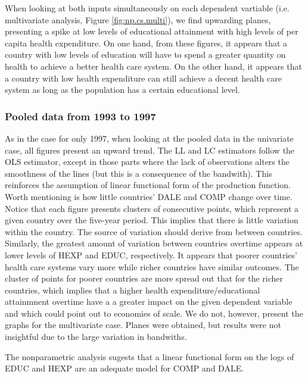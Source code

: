 \documentclass[12pt,a4paper]{article}\usepackage[]{graphicx}\usepackage[]{color}
\begin{document}
When looking at both inputs simultaneously on each dependent vartiable (i.e. multivariate analysis, Figure \ref{fig:np.cs.multi}), we find upwarding planes, presenting a spike at low levels of educational attainment with high levels of per capita health expenditure. On one hand, from these figures, it appears that a country with low levels of education will have to spend a greater quantity on health to achieve a better health care system. On the other hand, it appears that a country with low health expenditure can still achieve a decent health care system as long as the population has a certain educational level.







\subsubsection{Pooled data from 1993 to 1997}

As in the case for only 1997, when looking at the pooled data in the univariate case, all figures present an upward trend. The LL and LC estimators follow the OLS estimator, except in those parts where the lack of observations alters the smoothness of the lines (but this is a consequence of the bandwith). This reinforces the assumption of linear functional form of the production function. Worth mentioning is how little countries' DALE and COMP change over time. Notice that each figure presents clusters of consecutive points, which represent a given country over the five-year period. This implies that there is little variation within the country. The source of variation should derive from between countries. Similarly, the greatest amount of variation between countries overtime appears at lower levels of HEXP and EDUC, respectively. It appears that poorer countries' health care systems vary more while richer countries have similar outcomes. The cluster of points for poorer countries are more spread out that for the richer countries, which implies that a higher health expenditure/educational attainmnent overtime have a a greater impact on the given dependent variable and which could point out to economies of scale. We do not, however, present the graphs for the multivariate case. Planes were obtained, but results were not insightful due to the large variation in bandwiths.

The nonparametric analysis sugests that a linear functional form on the logs of EDUC and HEXP are an adequate model for COMP and DALE.
\end{document}
